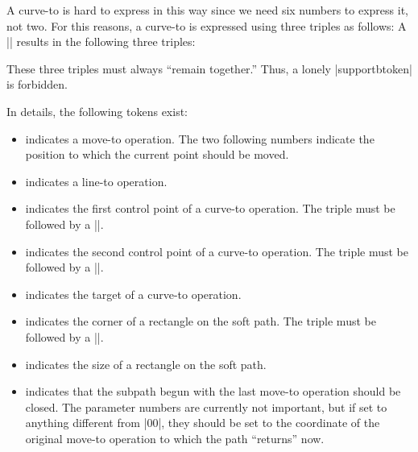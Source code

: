 A curve-to is hard to express in this way since we need six numbers to
express it, not two. For this reasons, a curve-to is expressed using
three triples as follows: A
|| results in the following
three triples:
\begin{codeexample}
\end{codeexample}

These three triples must always ``remain together.'' Thus, a lonely
|supportbtoken| is forbidden.

In details, the following tokens exist:
\begin{itemize}
\item
  \declare{|\pgfsyssoftpath@movetotoken|} indicates a move-to
  operation. The two following numbers indicate the position to which
  the current point should be moved.
\item
  \declare{|\pgfsyssoftpath@linetotoken|} indicates a line-to
  operation. 
\item
  \declare{|\pgfsyssoftpath@curvetosupportatoken|} indicates the first
  control point of a curve-to operation. The triple must be followed
  by a |\pgfsyssoftpath@curvetosupportbtoken|.
\item
  \declare{|\pgfsyssoftpath@curvetosupportbtoken|} indicates the second
  control point of a curve-to operation. The triple must be followed
  by a |\pgfsyssoftpath@curvetotoken|.
\item
  \declare{|\pgfsyssoftpath@curvetotoken|} indicates the target
  of a curve-to operation.
\item
  \declare{|\pgfsyssoftpath@rectcornertoken|} indicates the corner of
  a rectangle on the soft path. The triple must be followed
  by a |\pgfsyssoftpath@rectsizetoken|.
\item
  \declare{|\pgfsyssoftpath@rectcornertoken|} indicates the size of
  a rectangle on the soft path.
\item
  \declare{|\pgfsyssoftpath@closepath|} indicates that the subpath
  begun with the last move-to operation should be closed. The parameter
  numbers are currently not important, but if set to anything
  different from |{0}{0}|, they should be set to the coordinate of the
  original move-to operation to which the path ``returns'' now.
\end{itemize}




